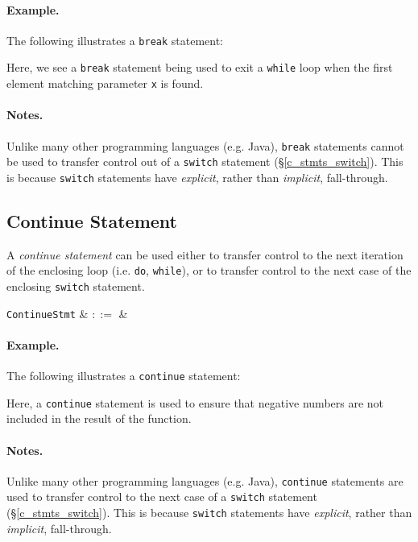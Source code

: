 \paragraph{Example.} The following illustrates a \lstinline{break} statement:




Here, we see a \lstinline{break} statement being used to exit a \lstinline{while} loop when the first element matching parameter \lstinline{x} is found.  

\paragraph{Notes.} Unlike many other programming languages (e.g. Java), \lstinline{break} statements cannot be used to transfer control out of a \lstinline{switch} statement (\S\ref{c_stmts_switch}).  This is because \lstinline{switch} statements have {\em explicit}, rather than {\em implicit}, fall-through.


\subsection{Continue Statement}
\label{c_stmts_continue}
A {\em continue statement} can be used either to transfer control to the next iteration of the enclosing loop (i.e. \lstinline{do}, \lstinline{while}), or to transfer control to the next case of the enclosing \lstinline{switch} statement.

\begin{syntax}
  \verb+ContinueStmt+ & $::=$ & \\
\end{syntax}

\paragraph{Example.} The following illustrates a \lstinline{continue} statement:



Here, a \lstinline{continue} statement is used to ensure that negative numbers are not included in the result of the function.

\paragraph{Notes.} Unlike many other programming languages (e.g. Java), \lstinline{continue} statements are used to transfer control to the next case of a \lstinline{switch} statement (\S\ref{c_stmts_switch}).  This is because \lstinline{switch} statements have {\em explicit}, rather than {\em implicit}, fall-through.

